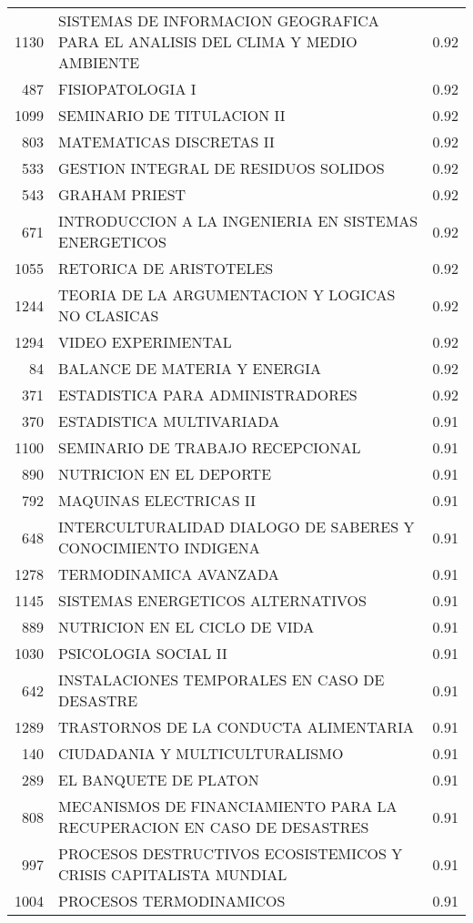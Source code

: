 \documentclass[12pt]{article}
\begin{document}
\begin{table}[ht]
\begin{tabular}{rlr}
  1130 & SISTEMAS DE INFORMACION GEOGRAFICA PARA EL ANALISIS DEL CLIMA Y MEDIO AMBIENTE & 0.92 \\ 
  487 & FISIOPATOLOGIA I & 0.92 \\ 
  1099 & SEMINARIO DE TITULACION II & 0.92 \\ 
  803 & MATEMATICAS DISCRETAS II & 0.92 \\ 
  533 & GESTION INTEGRAL DE RESIDUOS SOLIDOS & 0.92 \\ 
  543 & GRAHAM PRIEST & 0.92 \\ 
  671 & INTRODUCCION A LA INGENIERIA EN SISTEMAS ENERGETICOS & 0.92 \\ 
  1055 & RETORICA DE ARISTOTELES & 0.92 \\ 
  1244 & TEORIA DE LA ARGUMENTACION Y LOGICAS NO CLASICAS & 0.92 \\ 
  1294 & VIDEO EXPERIMENTAL & 0.92 \\ 
  84 & BALANCE DE MATERIA Y ENERGIA & 0.92 \\ 
  371 & ESTADISTICA PARA ADMINISTRADORES & 0.92 \\ 
  370 & ESTADISTICA MULTIVARIADA & 0.91 \\ 
  1100 & SEMINARIO DE TRABAJO RECEPCIONAL & 0.91 \\ 
  890 & NUTRICION EN EL DEPORTE & 0.91 \\ 
  792 & MAQUINAS ELECTRICAS II & 0.91 \\ 
  648 & INTERCULTURALIDAD DIALOGO DE SABERES Y CONOCIMIENTO INDIGENA & 0.91 \\ 
  1278 & TERMODINAMICA AVANZADA & 0.91 \\ 
  1145 & SISTEMAS ENERGETICOS ALTERNATIVOS & 0.91 \\ 
  889 & NUTRICION EN EL CICLO DE VIDA & 0.91 \\ 
  1030 & PSICOLOGIA SOCIAL II & 0.91 \\ 
  642 & INSTALACIONES TEMPORALES EN CASO DE DESASTRE & 0.91 \\ 
  1289 & TRASTORNOS DE LA CONDUCTA ALIMENTARIA & 0.91 \\ 
  140 & CIUDADANIA Y MULTICULTURALISMO & 0.91 \\ 
  289 & EL BANQUETE DE PLATON & 0.91 \\ 
  808 & MECANISMOS DE FINANCIAMIENTO PARA LA RECUPERACION EN CASO DE DESASTRES & 0.91 \\ 
  997 & PROCESOS DESTRUCTIVOS ECOSISTEMICOS Y CRISIS CAPITALISTA MUNDIAL & 0.91 \\ 
  1004 & PROCESOS TERMODINAMICOS & 0.91 \\ 

\end{tabular}
\end{table}
\end{document}
